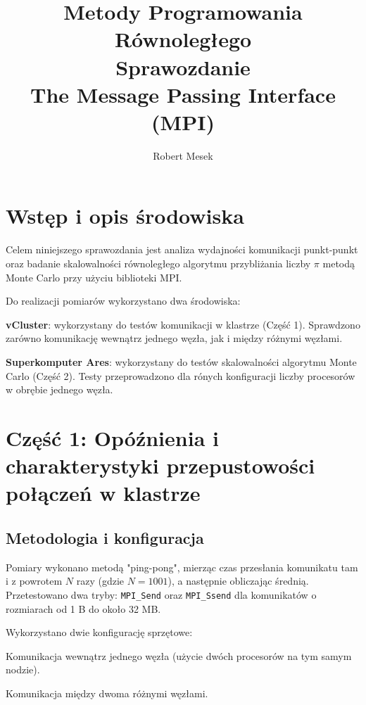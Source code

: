 \documentclass{article}
\title{Metody Programowania Równoległego\\Sprawozdanie\\The Message Passing Interface (MPI)}
\author{Robert Mesek}
\date{}
\begin{document}
\maketitle
\tableofcontents

\newpage

\section{Wstęp i opis środowiska}
Celem niniejszego sprawozdania jest analiza wydajności komunikacji punkt-punkt oraz badanie skalowalności równoległego algorytmu przybliżania liczby $\pi$ metodą Monte Carlo przy użyciu biblioteki MPI. 

Do realizacji pomiarów wykorzystano dwa środowiska:
\begin{compactitem}
    \item \textbf{vCluster}: wykorzystany do testów komunikacji w klastrze (Część 1). Sprawdzono zarówno komunikację wewnątrz jednego węzła, jak i między różnymi węzłami.
    \item \textbf{Superkomputer Ares}: wykorzystany do testów skalowalności algorytmu Monte Carlo (Część 2). Testy przeprowadzono dla rónych konfiguracji liczby procesorów w obrębie jednego węzła.
\end{compactitem}

\section{Część 1: Opóźnienia i charakterystyki przepustowości połączeń w klastrze}

\subsection{Metodologia i konfiguracja}
Pomiary wykonano metodą "ping-pong", mierząc czas przesłania komunikatu tam i z powrotem $N$ razy (gdzie $N = 1001$), a następnie obliczając średnią. 
Przetestowano dwa tryby: \texttt{MPI\_Send} oraz \texttt{MPI\_Ssend} dla komunikatów o rozmiarach od 1 B do około 32 MB. 

Wykorzystano dwie konfigurację sprzętowe:
\begin{compactitem}
    \item Komunikacja wewnątrz jednego węzła (użycie dwóch procesorów na tym samym nodzie).
    \item Komunikacja między dwoma różnymi węzłami.
\end{compactitem}
\end{document}
